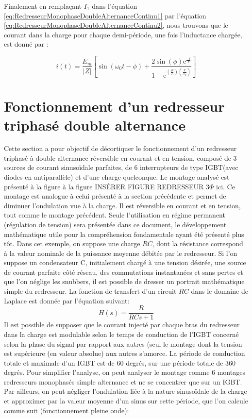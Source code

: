 Finalement en remplaçant $I_1$ dans l'équation \ref{eq:RedresseurMonophaseDoubleAlternanceContinu1} par l'équation \ref{eq:RedresseurMonophaseDoubleAlternanceContinu2}, nous trouvons que le courant dans la charge pour chaque demi-période, une fois l'inductance chargée, est donné par :

\begin{equation}
	i(t) = \frac{E_m}{|Z|}\left[\sin{(\omega_0 t - \phi)} + \frac{2\sin(\phi) \mbox{e}^{\frac{-t}{\tau}}}{1-\mbox{e}^{\left(\frac{R}{L}\right)\left(\frac{\pi}{\omega_0}\right)}} \right] 
\end{equation}

\section{Fonctionnement d'un redresseur triphasé double alternance}
Cette section a pour objectif de décortiquer le fonctionnement d'un redresseur triphasé à double alternance réversible en courant et en tension, composé de 3 sources de courant sinusoïdale parfaites, de 6 interrupteurs de type IGBT(avec diodes en antiparallèle) et d'une charge quelconque. Le montage analysé est présenté à la figure à la figure INSÉRER FIGURE REDRESSEUR 3$\Phi$ ici. Ce montage est analogue à celui présenté à la section précédente et permet de diminuer l'ondulation vue à la charge. Il est réversible en courant et en tension, tout comme le montage précédent. Seule l'utilisation en régime permanent (régulation de tension) sera présentée dans ce document, le développement mathématique utile pour la compréhension fondamentale ayant été présenté plus tôt. Dans cet exemple, on suppose une charge $RC$, dont la résistance correspond à la valeur nominale de la puissance moyenne débitée par le redresseur. Si l'on suppose un condensateur C, initialement chargé à une tension désirée, une source de courant parfaite côté réseau, des commutations instantanées et sans pertes et que l'on néglige les snubbers, il est possible de dresser un portrait mathématique simple du redresseur. La fonction de transfert d'un circuit $RC$ dans le domaine de Laplace est donnée par l'équation suivant:
\begin{equation}
H(s) = \frac{R}{RCs + 1}
\end{equation}
Il est possible de supposer que le courant injecté par chaque bras du redresseur dans la charge est modulable selon le temps de conduction de l'IGBT concerné selon la phase du signal par rapport aux autres (seul le montage dont la tension est supérieure (en valeur absolue) aux autres s'amorce. La période de conduction totale et maximale d'un IGBT est de 60 degrés, sur une période totale de 360 degrés. Pour simplifier l'analyse, on peut analyser le montage comme 6 montages redresseurs monophasés simple alternance et ne se concentrer que sur un IGBT. Par ailleurs, on peut négliger l'ondulation liée à la nature sinusoïdale de la charge et approximer par la valeur moyenne d'un sinus sur cette période, que l'on calcule comme suit (fonctionnement pleine onde):
